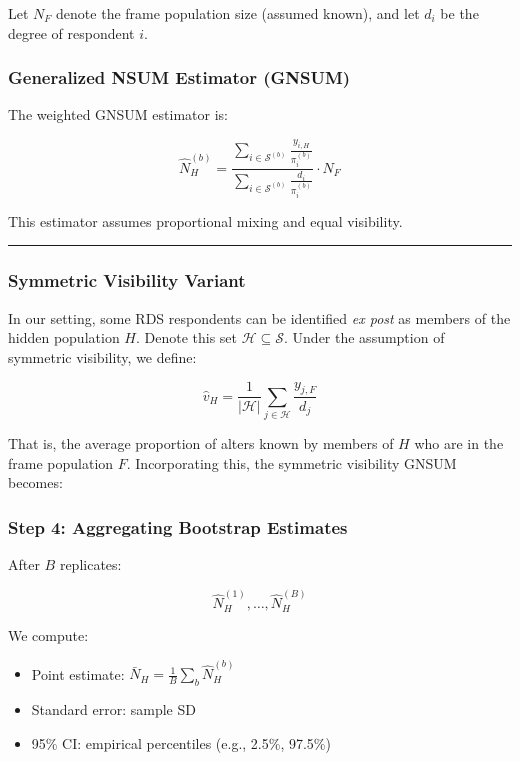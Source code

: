 \documentclass[
  12pt,
  letterpaper,
  DIV=11,
  numbers=noendperiod]{scrartcl}
\theoremstyle{plain}
\theoremstyle{definition}
\begin{document}
Let \(N_F\) denote the frame population size (assumed known), and let
\(d_i\) be the degree of respondent \(i\).

\subsubsection{Generalized NSUM Estimator
(GNSUM)}\label{generalized-nsum-estimator-gnsum}

The weighted GNSUM estimator is:

\[
\hat{N}_H^{(b)} = \frac{\sum_{i \in \mathcal{S}^{(b)}} \frac{y_{i,H}}{\pi_i^{(b)}}}{\sum_{i \in \mathcal{S}^{(b)}} \frac{d_i}{\pi_i^{(b)}}} \cdot N_F
\]

This estimator assumes proportional mixing and equal visibility.

\begin{center}\rule{0.5\linewidth}{0.5pt}\end{center}

\subsubsection{Symmetric Visibility
Variant}\label{symmetric-visibility-variant}

In our setting, some RDS respondents can be identified \emph{ex post} as
members of the hidden population \(H\). Denote this set
\(\mathcal{H} \subseteq \mathcal{S}\). Under the assumption of symmetric
visibility, we define:

\[
\hat{v}_{H} = \frac{1}{|\mathcal{H}|} \sum_{j \in \mathcal{H}} \frac{y_{j,F}}{d_j}
\]

That is, the average proportion of alters known by members of \(H\) who
are in the frame population \(F\). Incorporating this, the symmetric
visibility GNSUM becomes:

\subsubsection{Step 4: Aggregating Bootstrap
Estimates}\label{step-4-aggregating-bootstrap-estimates}

After \(B\) replicates:

\[\hat{N}_H^{(1)}, \dots, \hat{N}_H^{(B)}\]

We compute:

\begin{itemize}
\item
  Point estimate: \(\bar{N}_H = \frac{1}{B} \sum_b \hat{N}_H^{(b)}\)
\item
  Standard error: sample SD
\item
  95\% CI: empirical percentiles (e.g., 2.5\%, 97.5\%)
\end{itemize}
\end{document}
